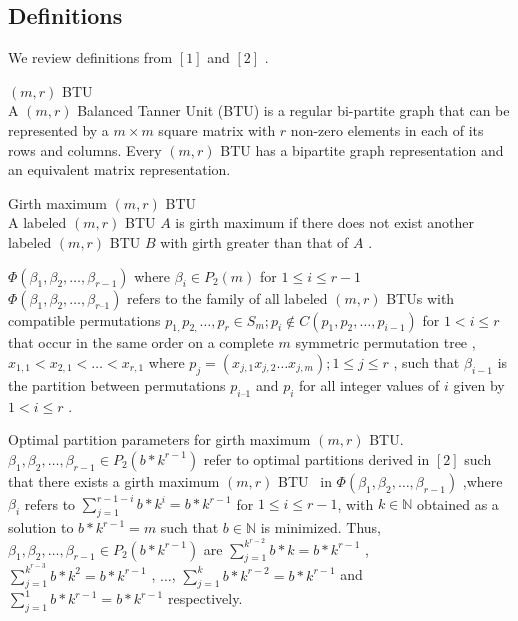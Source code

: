 \documentclass{llncs}
\begin{document}
\subsection{Definitions}
We review definitions from  $[1]$ and  $[2]$ .

\begin{definition} $(m, r)$ BTU \\
A $(m,r)$ Balanced Tanner Unit (BTU) is a regular bi-partite graph that can be represented by a $m \times m$ square matrix with $r$ non-zero elements in each of its rows and columns. Every $(m,r)$ BTU has a bipartite graph representation and an equivalent matrix representation.
\end{definition}

\begin{definition} {Girth maximum $(m,r)$ BTU} \\
{A labeled $(m,r)$  BTU  $A$ is girth maximum if there does not exist another labeled $(m,r)$  BTU $B$ with girth greater than that of $A$ .}
\end{definition}

\begin{definition} $\Phi (\beta _{1},\beta _{2},\ldots ,\beta _{r - 1})$ where $\beta _{i}\in P_{2}(m)$ for  $1\le i\le r-1$  \\
 $\Phi (\beta _{1},\beta _{2},\ldots ,\beta _{r\text{--}1})$ refers to the family of all labeled $(m,r)$ BTUs with compatible permutations  $p_{1,}p_{2,}\ldots ,p_{r}\in S_{m};p_{i}\notin C(p_{1},p_{2},\ldots ,p_{i-1})$ for  $1<i\le r$ that occur in the same order on a complete $m$ symmetric permutation tree ,  $x_{1,1}<x_{2,1}<\ldots <x_{r,1}$ where  $p_{j}=(x_{j,1}x_{j,2}\ldots x_{j,m});1\le j\le r$ , such that  $\beta _{i-1}$  is the partition between permutations $p_{i\text{--}1}$  and  $p_{i}$  for all integer values of  $i$  given by  $1<i\le r$ .
\end{definition}
\begin{definition} {Optimal partition parameters for girth maximum $(m, r)$ BTU}.
$\beta _{1},\beta _{2},\ldots ,\beta _{r-1}\in P_{2}(b\ast k^{r-1})$ refer to optimal partitions derived in $[2]$ such that there exists a girth maximum $(m,r)$ BTU \ in $\Phi (\beta _{1},\beta _{2},\ldots ,\beta _{r-1})$ ,where $\beta _{i}$ refers to $\sum _{j=1}^{r-1-i}b\ast k^{i}=b\ast k^{r-1}$ for $1\le i\le r-1$, with $k \in \mathbb{N}$ obtained as a solution to $b\ast k^{r -1} = m$ such that $b \in \mathbb{N}$ is minimized. Thus,  $\beta _{1},\beta _{2},\ldots ,\beta _{r-1}\in P_{2}(b\ast k^{r-1})$  are $\sum _{j=1}^{k^{r-2}}b\ast k=b\ast k^{r-1}$ , $\sum _{j=1}^{k^{r-3}}b\ast k^{2}=b\ast k^{r-1}$ , $\ldots $, $\sum _{j=1}^{k}b\ast k^{r-2}=b\ast k^{r-1}$ and $\sum _{j=1}^{1}b\ast k^{r-1}=b\ast k^{r-1}$ respectively.
\end{definition}
\end{document}

